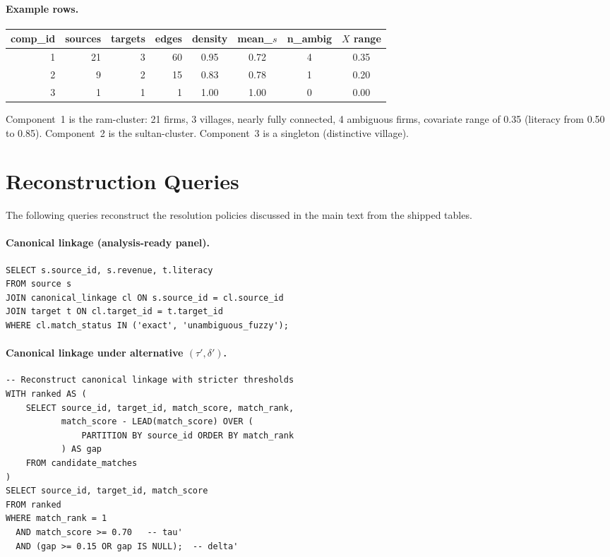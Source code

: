 \documentclass[12pt]{article}
\begin{document}
\paragraph{Example rows.}

\begin{center}
\small
\begin{tabular}{rrrrcccc}
\toprule
comp\_id & sources & targets & edges & density & mean\_$s$ & n\_ambig & $X$ range \\
\midrule
1 & 21 & 3 & 60 & 0.95 & 0.72 & 4 & 0.35 \\
2 & 9 & 2 & 15 & 0.83 & 0.78 & 1 & 0.20 \\
3 & 1 & 1 & 1 & 1.00 & 1.00 & 0 & 0.00 \\
\bottomrule
\end{tabular}
\end{center}

Component~1 is the ram-cluster: 21 firms, 3 villages, nearly fully connected, 4 ambiguous firms, covariate range of 0.35 (literacy from 0.50 to 0.85). Component~2 is the sultan-cluster. Component~3 is a singleton (distinctive village).

\section{Reconstruction Queries}

The following queries reconstruct the resolution policies discussed in the main text from the shipped tables.

\paragraph{Canonical linkage (analysis-ready panel).}

\begin{lstlisting}[style=sql]
SELECT s.source_id, s.revenue, t.literacy
FROM source s
JOIN canonical_linkage cl ON s.source_id = cl.source_id
JOIN target t ON cl.target_id = t.target_id
WHERE cl.match_status IN ('exact', 'unambiguous_fuzzy');
\end{lstlisting}

\paragraph{Canonical linkage under alternative $(\tau', \delta')$.}

\begin{lstlisting}[style=sql]
-- Reconstruct canonical linkage with stricter thresholds
WITH ranked AS (
    SELECT source_id, target_id, match_score, match_rank,
           match_score - LEAD(match_score) OVER (
               PARTITION BY source_id ORDER BY match_rank
           ) AS gap
    FROM candidate_matches
)
SELECT source_id, target_id, match_score
FROM ranked
WHERE match_rank = 1
  AND match_score >= 0.70   -- tau'
  AND (gap >= 0.15 OR gap IS NULL);  -- delta'
\end{lstlisting}
\end{document}
